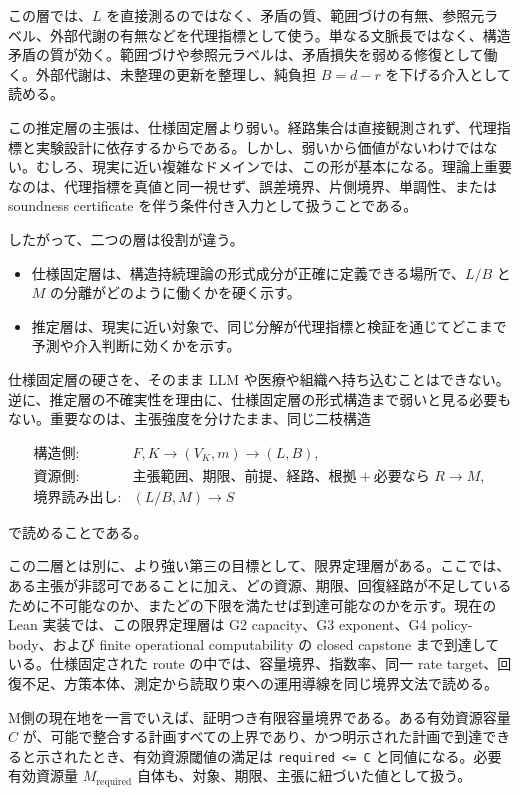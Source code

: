 \documentclass[12pt,a4paper]{article}
\begin{document}
この層では、\(L\) を直接測るのではなく、矛盾の質、範囲づけの有無、参照元ラベル、外部代謝の有無などを代理指標として使う。単なる文脈長ではなく、構造矛盾の質が効く。範囲づけや参照元ラベルは、矛盾損失を弱める修復として働く。外部代謝は、未整理の更新を整理し、純負担 \(B=d-r\) を下げる介入として読める。

この推定層の主張は、仕様固定層より弱い。経路集合は直接観測されず、代理指標と実験設計に依存するからである。しかし、弱いから価値がないわけではない。むしろ、現実に近い複雑なドメインでは、この形が基本になる。理論上重要なのは、代理指標を真値と同一視せず、誤差境界、片側境界、単調性、または soundness certificate を伴う条件付き入力として扱うことである。

したがって、二つの層は役割が違う。

\begin{itemize}
\tightlist
\item
  仕様固定層は、構造持続理論の形式成分が正確に定義できる場所で、\(L/B\) と \(M\) の分離がどのように働くかを硬く示す。
\item
  推定層は、現実に近い対象で、同じ分解が代理指標と検証を通じてどこまで予測や介入判断に効くかを示す。
\end{itemize}

仕様固定層の硬さを、そのまま LLM や医療や組織へ持ち込むことはできない。逆に、推定層の不確実性を理由に、仕様固定層の形式構造まで弱いと見る必要もない。重要なのは、主張強度を分けたまま、同じ二枝構造

\[
\begin{array}{ll}
\text{構造側:} & F,K \to (V_K,m) \to (L,B),\\
\text{資源側:} & \text{主張範囲、期限、前提、経路、根拠}
                 + \text{必要なら }R \to M,\\
\text{境界読み出し:} & (L/B,M) \to S
\end{array}
\]

で読めることである。

この二層とは別に、より強い第三の目標として、限界定理層がある。ここでは、ある主張が非認可であることに加え、どの資源、期限、回復経路が不足しているために不可能なのか、またどの下限を満たせば到達可能なのかを示す。現在の Lean 実装では、この限界定理層は G2 capacity、G3 exponent、G4 policy-body、および finite operational computability の closed capstone まで到達している。仕様固定された route の中では、容量境界、指数率、同一 rate target、回復不足、方策本体、測定から読取り束への運用導線を同じ境界文法で読める。

M側の現在地を一言でいえば、証明つき有限容量境界である。ある有効資源容量 \(C\) が、可能で整合する計画すべての上界であり、かつ明示された計画で到達できると示されたとき、有効資源閾値の満足は \texttt{required\ \textless{}=\ C} と同値になる。必要有効資源量 \(M_{\mathrm{required}}\) 自体も、対象、期限、主張に紐づいた値として扱う。
\end{document}
